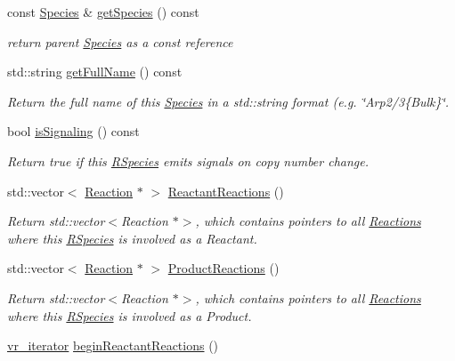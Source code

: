\begin{DoxyCompactItemize}
const \hyperlink{classchem_1_1Species}{Species} \& \hyperlink{classchem_1_1RSpecies_a74953c2446c0261fc5732a63e3392a15}{get\-Species} () const 
\begin{DoxyCompactList}\small\item\em return parent \hyperlink{classchem_1_1Species}{Species} as a const reference \end{DoxyCompactList}\item 
std\-::string \hyperlink{classchem_1_1RSpecies_af4e42cfd817f05b2de169275e3496399}{get\-Full\-Name} () const 
\begin{DoxyCompactList}\small\item\em Return the full name of this \hyperlink{classchem_1_1Species}{Species} in a std\-::string format (e.\-g. \char`\"{}\-Arp2/3\{\-Bulk\}\char`\"{}. \end{DoxyCompactList}\item 
bool \hyperlink{classchem_1_1RSpecies_a652a2d0f305a8ab84305ff1dd1fd41b8}{is\-Signaling} () const 
\begin{DoxyCompactList}\small\item\em Return true if this \hyperlink{classchem_1_1RSpecies}{R\-Species} emits signals on copy number change. \end{DoxyCompactList}\item 
std\-::vector$<$ \hyperlink{classchem_1_1Reaction}{Reaction} $\ast$ $>$ \hyperlink{classchem_1_1RSpecies_a2ef2e5df3813cade5fdeea7e9ca8b219}{Reactant\-Reactions} ()
\begin{DoxyCompactList}\small\item\em Return std\-::vector$<$\-Reaction $\ast$$>$, which contains pointers to all \hyperlink{classchem_1_1Reaction}{Reactions} where this \hyperlink{classchem_1_1RSpecies}{R\-Species} is involved as a Reactant. \end{DoxyCompactList}\item 
std\-::vector$<$ \hyperlink{classchem_1_1Reaction}{Reaction} $\ast$ $>$ \hyperlink{classchem_1_1RSpecies_a7b4e705a0195b0a7575c6fd3a4ff2a32}{Product\-Reactions} ()
\begin{DoxyCompactList}\small\item\em Return std\-::vector$<$\-Reaction $\ast$$>$, which contains pointers to all \hyperlink{classchem_1_1Reaction}{Reactions} where this \hyperlink{classchem_1_1RSpecies}{R\-Species} is involved as a Product. \end{DoxyCompactList}\item 
\hyperlink{namespacechem_a6c6fe26056b061cb8512c46063ad758e}{vr\-\_\-iterator} \hyperlink{classchem_1_1RSpecies_abb162e65b6a0bb4953be60299e23a8e1}{begin\-Reactant\-Reactions} ()

\end{DoxyCompactItemize}
